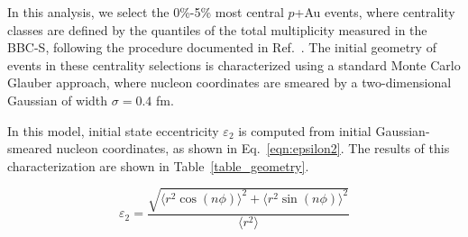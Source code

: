 \documentclass[%
reprint,
showpacs,preprintnumbers,
 amsmath,amssymb,
 aps,
]{revtex4-1}
\newcommand{\pau}{\mbox{$p$+Au}\xspace}
\begin{document}
In this analysis, we select the 0\%-5\% most central \pau events, where 
centrality classes are defined by the quantiles of the total multiplicity measured in the BBC-S, following the procedure documented in Ref.~\cite{bbc}.
The initial geometry of events in these centrality selections is characterized using a standard Monte Carlo Glauber approach, where nucleon coordinates are smeared by a two-dimensional Gaussian of width $\sigma = 0.4$ fm. 

In this model, initial state eccentricity $\varepsilon_2$ is computed from initial Gaussian-smeared nucleon coordinates, as shown in Eq.~\ref{eqn:epsilon2}. The results of this characterization are shown in Table~\ref{table_geometry}.

\begin{equation}
\label{eqn:epsilon2}
\varepsilon_2 = \frac{\sqrt{\langle r^2\cos (n\phi)\rangle ^2 + \langle r^2\sin (n\phi) \rangle ^2}}{\langle r^2 \rangle}
\end{equation}
\end{document}
